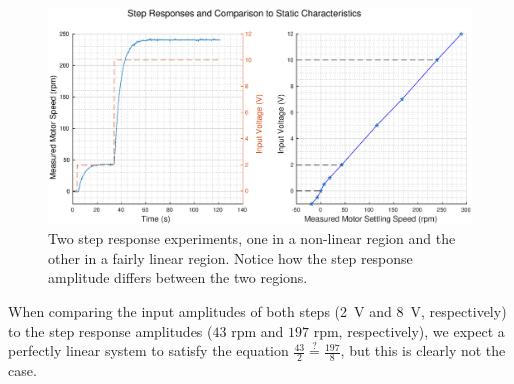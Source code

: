 \begin{figure}[t]
    \centering
    \includegraphics[width=\linewidth]{images/step_response}
    \caption{Two step response experiments, one in a non-linear region and the other in a fairly linear region. Notice how the step response amplitude differs between the two regions.}
    \label{fig:step_responses}
\end{figure}

When  comparing  the  input  amplitudes  of   both  steps  (\SI{2}{\volt}  and
\SI{8}{\volt}, respectively) to the  step  response  amplitudes  ($43$ rpm and
$197$ rpm, respectively), we expect a perfectly linear system  to  satisfy the
equation $\frac{43}{2} \stackrel{?}{=} \frac{197}{8}$, but this is clearly not
the case.

